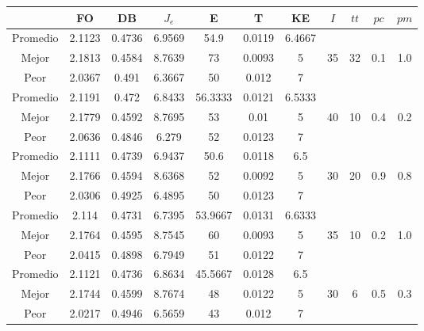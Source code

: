 \begin{table}[h!]
    \footnotesize
    \begin{center}
        \begin{tabular}{|c|c|c|c|c|c|c|c|c|c|c|}
        \hline
             & {\bf FO} & {\bf DB} & $J_e$ & {\bf E} & {\bf T} & {\bf KE} & $I$ & $tt$ & $pc$ & $pm$ \\
        \hline
        \hline
            Promedio  & 2.1123 & 0.4736 & 6.9569 & 54.9 & 0.0119 & 6.4667 &  &  &  & \\
            \cline{1-7}
            Mejor & 2.1813 & 0.4584  & 8.7639 & 73 & 0.0093 & 5 & 35 & 32 & 0.1 & 1.0\\
            \cline{1-7}
            Peor & 2.0367 & 0.491  & 6.3667 & 50 & 0.012 & 7 &  &  &  & \\
        \hline
        \hline
            Promedio  & 2.1191 & 0.472 & 6.8433 & 56.3333 & 0.0121 & 6.5333 &  &  &  & \\
            \cline{1-7}
            Mejor & 2.1779 & 0.4592  & 8.7695 & 53 & 0.01 & 5 & 40 & 10 & 0.4 & 0.2\\
            \cline{1-7}
            Peor & 2.0636 & 0.4846  & 6.279 & 52 & 0.0123 & 7 &  &  &  & \\
        \hline
        \hline
            Promedio  & 2.1111 & 0.4739 & 6.9437 & 50.6 & 0.0118 & 6.5 &  &  &  & \\
            \cline{1-7}
            Mejor & 2.1766 & 0.4594  & 8.6368 & 52 & 0.0092 & 5 & 30 & 20 & 0.9 & 0.8\\
            \cline{1-7}
            Peor & 2.0306 & 0.4925  & 6.4895 & 50 & 0.0123 & 7 &  &  &  & \\
        \hline
        \hline
            Promedio  & 2.114 & 0.4731 & 6.7395 & 53.9667 & 0.0131 & 6.6333 &  &  &  & \\
            \cline{1-7}
            Mejor & 2.1764 & 0.4595  & 8.7545 & 60 & 0.0093 & 5 & 35 & 10 & 0.2 & 1.0\\
            \cline{1-7}
            Peor & 2.0415 & 0.4898  & 6.7949 & 51 & 0.0122 & 7 &  &  &  & \\
        \hline
        \hline
            Promedio  & 2.1121 & 0.4736 & 6.8634 & 45.5667 & 0.0128 & 6.5 &  &  &  & \\
            \cline{1-7}
            Mejor & 2.1744 & 0.4599  & 8.7674 & 48 & 0.0122 & 5 & 30 & 6 & 0.5 & 0.3\\
            \cline{1-7}
            Peor & 2.0217 & 0.4946  & 6.5659 & 43 & 0.012 & 7 &  &  &  & \\

\end{tabular}
\end{center}
\end{table}
